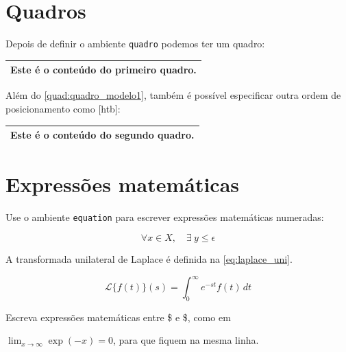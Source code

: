 \section{Quadros}

Depois de definir o ambiente \texttt{quadro} podemos ter um quadro:

\begin{quadro}
  \caption[Legenda do primeiro quadro.]{Legenda do primeiro quadro.}%
  \label{quad:quadro_modelo1}
  \centering
  \begin{tabular}{c}
  \toprule
  Este é o conteúdo do primeiro quadro.\\
  \bottomrule
  \end{tabular}
\end{quadro}

Além do \autoref{quad:quadro_modelo1}, também é possível especificar outra ordem
de posicionamento como [htb]:

\begin{quadro}[htb]
  \caption[Legenda do segundo quadro.]{Legenda do segundo quadro.}%
  \label{quad:quadro_modelo2}
  \centering
  \begin{tabular}{c}
  \toprule
  Este é o conteúdo do segundo quadro.\\
  \bottomrule
  \end{tabular}
\end{quadro}

\section{Expressões matemáticas}

Use o ambiente \texttt{equation} para escrever
expressões matemáticas numeradas:

\begin{equation}
  \forall x \in X, \quad \exists \: y \leq \epsilon
\end{equation}

A transformada unilateral de Laplace é definida na \autoref{eq:laplace_uni}.

\begin{equation}\label{eq:laplace_uni}
  \mathcal{L}\{f(t)\}(s) = \int_{0}^{\infty} e^{-st} f(t)\, dt
\end{equation}

Escreva expressões matemáticas entre \$ e \$, como em 

$\lim_{x \to \infty}
\exp(-x) = 0 $, para que fiquem na mesma linha.

